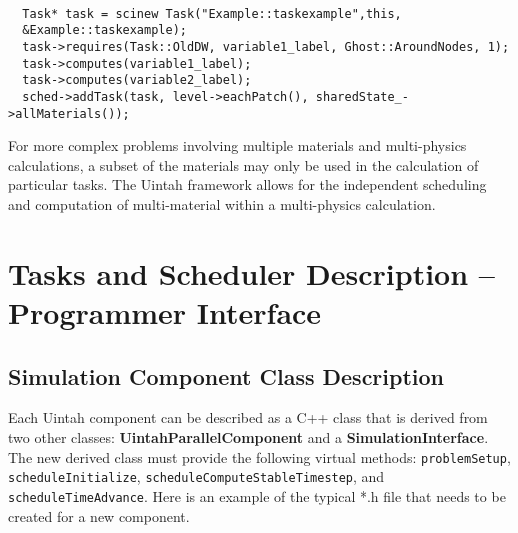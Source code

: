 \documentclass[11pt,fleqn]{book} %
\begin{document}
\begin{lstlisting}

  Task* task = scinew Task("Example::taskexample",this,
  &Example::taskexample);
  task->requires(Task::OldDW, variable1_label, Ghost::AroundNodes, 1);
  task->computes(variable1_label);
  task->computes(variable2_label);
  sched->addTask(task, level->eachPatch(), sharedState_->allMaterials());

\end{lstlisting}

For more complex problems involving multiple materials and
multi-physics calculations, a subset of the materials may only be used
in the calculation of particular tasks.  The Uintah framework allows
for the independent scheduling and computation of multi-material
within a multi-physics calculation.

\section{Tasks and Scheduler Description -- Programmer Interface}

\subsection{Simulation Component Class Description}

Each Uintah component can be described as a C++ class that is derived
from two other classes: \textbf{UintahParallelComponent} and a
\textbf{SimulationInterface}. The new derived class must provide the
following virtual methods: \texttt{problemSetup},
\texttt{scheduleInitialize}, \texttt{scheduleComputeStableTimestep},
and \texttt{scheduleTimeAdvance}.  Here is an example of the typical
*.h file that needs to be created for a new component.
\end{document}
